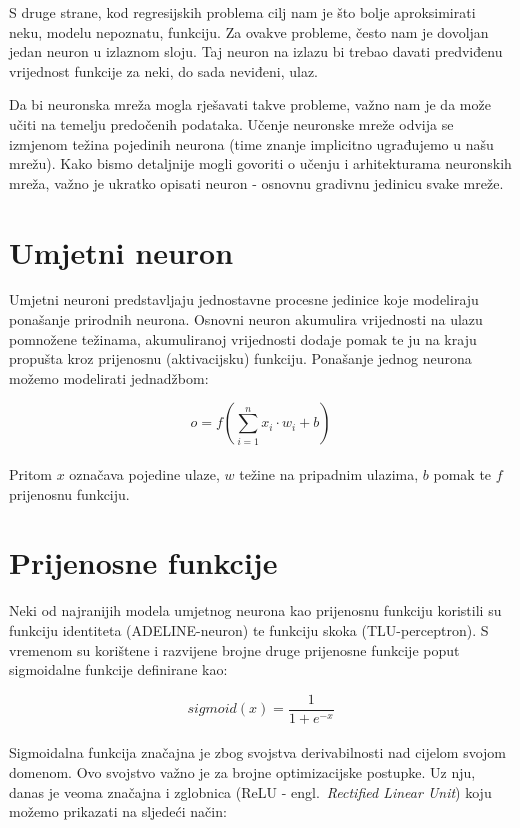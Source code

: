 \documentclass[times, utf8, zavrsni, numeric]{fer}
\begin{document}
S druge strane, kod regresijskih problema cilj nam je što bolje aproksimirati neku, modelu nepoznatu, funkciju. Za ovakve probleme, često nam je dovoljan jedan neuron u izlaznom sloju. 
Taj neuron na izlazu bi trebao davati predviđenu vrijednost funkcije za neki, do sada neviđeni, ulaz.

Da bi neuronska mreža mogla rješavati takve probleme, važno nam je da može učiti na temelju predočenih podataka. Učenje neuronske mreže odvija se izmjenom težina pojedinih neurona (time znanje implicitno ugrađujemo u našu mrežu).
Kako bismo detaljnije mogli govoriti o učenju i arhitekturama neuronskih mreža, važno je ukratko opisati neuron - osnovnu gradivnu jedinicu svake mreže.
\pagebreak
\section{Umjetni neuron}
Umjetni neuroni predstavljaju jednostavne procesne jedinice koje modeliraju ponašanje prirodnih neurona. Osnovni neuron akumulira vrijednosti na ulazu pomnožene težinama, 
akumuliranoj vrijednosti dodaje pomak te ju na kraju propušta kroz prijenosnu (aktivacijsku) funkciju. Ponašanje jednog neurona možemo modelirati jednadžbom:

\begin{equation}
    o = f(\sum_{i=1}^{n}x_{i} \cdot w_{i} + b)
    \label{eq:neuron}
\end{equation}
\\
\noindent Pritom $x$ označava pojedine ulaze, $w$ težine na pripadnim ulazima, $b$ pomak te $f$ prijenosnu funkciju. 

\section{Prijenosne funkcije}
Neki od najranijih modela umjetnog neurona kao prijenosnu funkciju koristili su funkciju identiteta (ADELINE-neuron) te funkciju skoka (TLU-perceptron).
S vremenom su korištene i razvijene brojne druge prijenosne funkcije poput sigmoidalne funkcije definirane kao:

\begin{equation}
    sigmoid(x) = \frac{1}{1 + e^{-x}}
    \label{eq:sigmoid}
\end{equation}
\\
Sigmoidalna funkcija značajna je zbog svojstva derivabilnosti nad cijelom svojom domenom. Ovo svojstvo važno je za brojne optimizacijske postupke.
Uz nju, danas je veoma značajna i zglobnica (ReLU - engl.\ \textit{Rectified Linear Unit}) koju možemo prikazati na sljedeći način:
\end{document}
